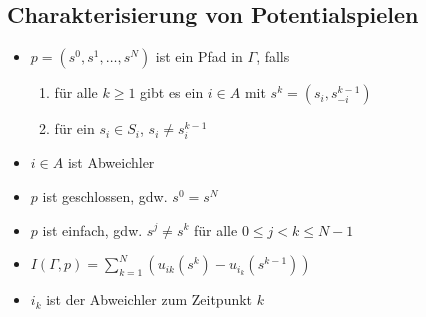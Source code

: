 \subsection{Charakterisierung von Potentialspielen}
	\begin{itemize}
		\item $p=(s^0,s^1,\dots,s^N)$ ist ein Pfad in $\Gamma$, falls
			\begin{enumerate}
				\item für alle $k\geq 1$ gibt es ein $i\in A$ mit $s^k = (s_i,s_{-i}^{k-1})$
				\item für ein $s_i\in S_i$, $s_i\neq s_i^{k-1}$
			\end{enumerate}
		\item $i\in A$ ist Abweichler
		\item $p$ ist geschlossen, gdw. $s^0=s^N$
		\item $p$ ist einfach, gdw. $s^j\neq s^k$ für alle $0\leq j<k\leq N-1$
		\item $I(\Gamma,p)=\sum\limits_{k=1}^N\left(u_{ik}(s^k)-u_{i_k}(s^{k-1})\right)$
		\item $i_k$ ist der Abweichler zum Zeitpunkt $k$
	\end{itemize}
\topbreak
